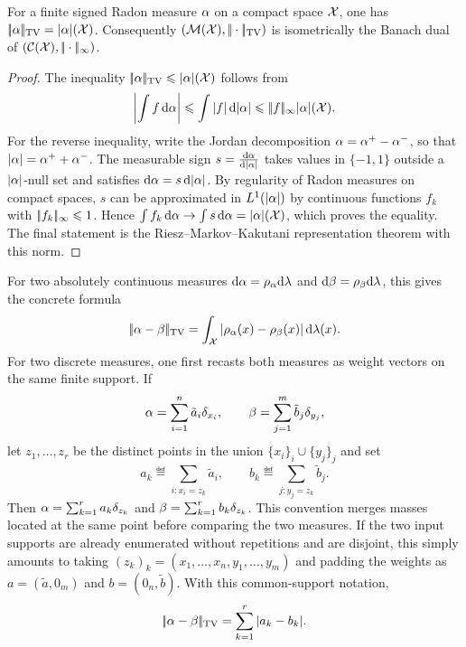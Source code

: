 \begin{prop}\label{prop-tv-dual-measure}
	For a finite signed Radon measure $\alpha$ on a compact space $\mathcal{X}$,
	one has $|\!| \alpha |\!|_{\operatorname{TV}}=|\alpha|(\mathcal{X})$.
	Consequently $(\mathcal{M}(\mathcal{X}),|\!| \cdot |\!|_{\operatorname{TV}})$ is isometrically the Banach dual of $(\mathcal{C}(\mathcal{X}),|\!| \cdot |\!|_\infty)$.
\end{prop}
\begin{proof}
	The inequality $|\!| \alpha |\!|_{\operatorname{TV}}\leqslant |\alpha|(\mathcal{X})$ follows from
	\[
		\left\lvert\int f\,\mathrm{d}\alpha\right\rvert\leqslant \int |f|\,\mathrm{d}|\alpha|\leqslant |\!| f |\!|_\infty |\alpha|(\mathcal{X}).
	\]
	For the reverse inequality, write the Jordan decomposition $\alpha=\alpha^+-\alpha^-$, so that $|\alpha|=\alpha^++\alpha^-$. The measurable sign $s=\frac{\mathrm{d}\alpha}{\mathrm{d}|\alpha|}$ takes values in $\{-1,1\}$ outside a $|\alpha|$-null set and satisfies $\mathrm{d}\alpha=s\,\mathrm{d}|\alpha|$. By regularity of Radon measures on compact spaces, $s$ can be approximated in $L^1(|\alpha|)$ by continuous functions $f_k$ with $|\!| f_k |\!|_\infty\leqslant1$. Hence $\int f_k\,\mathrm{d}\alpha\to\int s\,\mathrm{d}\alpha=|\alpha|(\mathcal{X})$, which proves the equality. The final statement is the Riesz--Markov--Kakutani representation theorem with this norm.
\end{proof}

For two absolutely continuous measures $\mathrm{d}\alpha=\rho_{\alpha}\mathrm{d}\lambda$ and $\mathrm{d}\beta=\rho_{\beta}\mathrm{d}\lambda$, this gives the concrete formula
\[
	|\!| \alpha-\beta |\!|_{\operatorname{TV}}
	=
	\int_{\mathcal{X}} |\rho_{\alpha}(x)-\rho_{\beta}(x)|\,\mathrm{d}\lambda(x).
\]
For two discrete measures, one first recasts both measures as weight vectors on
the same finite support. If
\[
	\alpha=\sum_{i=1}^n \tilde a_i\delta_{x_i},
	\qquad
	\beta=\sum_{j=1}^m \tilde b_j\delta_{y_j},
\]
let $z_1,\ldots,z_r$ be the distinct points in the union
$\{x_i\}_i\cup\{y_j\}_j$ and set
\[
	a_k\eqdef\sum_{i:x_i=z_k}\tilde a_i,
	\qquad
	b_k\eqdef\sum_{j:y_j=z_k}\tilde b_j.
\]
Then $\alpha=\sum_{k=1}^r a_k\delta_{z_k}$ and
$\beta=\sum_{k=1}^r b_k\delta_{z_k}$.
This convention merges masses located at the same point before comparing the two
measures. If the two input supports are already enumerated without repetitions
and are disjoint, this simply amounts to taking
$(z_k)_k=(x_1,\ldots,x_n,y_1,\ldots,y_m)$ and padding the weights as
$a=(\tilde a,0_m)$ and $b=(0_n,\tilde b)$. With this common-support notation,
\[
	|\!| \alpha-\beta |\!|_{\operatorname{TV}}
	=
	\sum_{k=1}^r |a_k-b_k|.
\]
